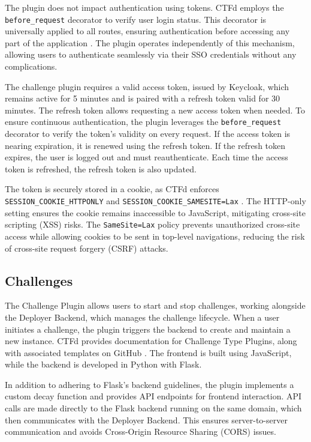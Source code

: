The plugin does not impact authentication using tokens. CTFd employs the \texttt{before\_\allowbreak request} decorator to verify user login status. This decorator is universally applied to all routes, ensuring authentication before accessing any part of the application \Parencite{CTFdInitialization}. The plugin operates independently of this mechanism, allowing users to authenticate seamlessly via their SSO credentials without any complications.

The challenge plugin requires a valid access token, issued by Keycloak, which remains active for 5 minutes and is paired with a refresh token valid for 30 minutes. The refresh token allows requesting a new access token when needed. To ensure continuous authentication, the plugin leverages the \texttt{before\_\allowbreak request} decorator to verify the token's validity on every request. If the access token is nearing expiration, it is renewed using the refresh token. If the refresh token expires, the user is logged out and must reauthenticate. Each time the access token is refreshed, the refresh token is also updated.

The token is securely stored in a cookie, as CTFd enforces \texttt{SESSION\_COOKIE\_\allowbreak HTTPONLY} and \texttt{SESSION\_COOKIE\_SAMESITE=Lax} \Parencite{CTFdConfig}. The HTTP-only setting ensures the cookie remains inaccessible to JavaScript, mitigating cross-site scripting (XSS) risks. The \texttt{SameSite=Lax} policy prevents unauthorized cross-site access while allowing cookies to be sent in top-level navigations, reducing the risk of cross-site request forgery (CSRF) attacks.

\subsection{Challenges}
The Challenge Plugin allows users to start and stop challenges, working alongside the Deployer Backend, which manages the challenge lifecycle. When a user initiates a challenge, the plugin triggers the backend to create and maintain a new instance. CTFd provides documentation for Challenge Type Plugins, along with associated templates on GitHub \parencite{CTFdChallengeTypes}. The frontend is built using JavaScript, while the backend is developed in Python with Flask.

In addition to adhering to Flask's backend guidelines, the plugin implements a custom decay function and provides API endpoints for frontend interaction. API calls are made directly to the Flask backend running on the same domain, which then communicates with the Deployer Backend. This ensures server-to-server communication and avoids Cross-Origin Resource Sharing (CORS) issues.

